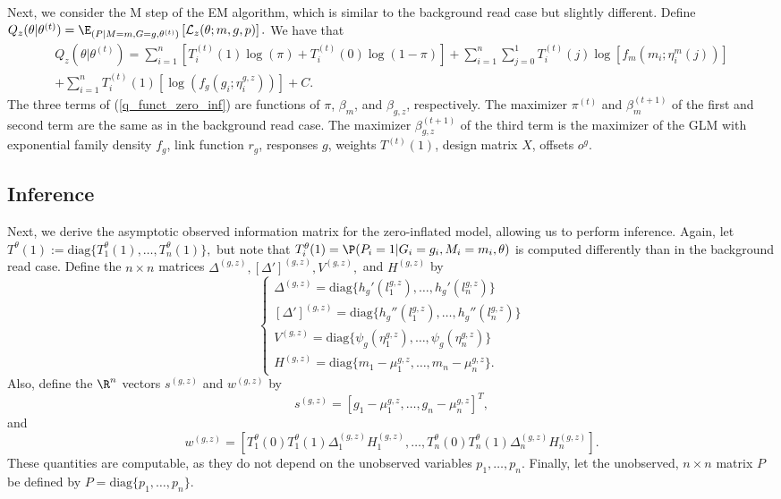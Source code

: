 \documentclass[12pt]{article}
\begin{document}
\begin{appendices}
Next, we consider the M step of the EM algorithm, which is similar to the background read case but slightly different. Define $Q_z(\theta | \theta^{(t)}) = \E_{(P | M = m, G = g, \theta^{(t)})} \left[ \mathcal{L}_z(\theta; m, g, p) \right].$ We have that
\begin{multline}\label{q_funct_zero_inf}
Q_z(\theta | \theta^{(t)}) = \sum_{i=1}^n \left[ T^{(t)}_i(1)\log(\pi) + T_i^{(t)}(0) \log(1 - \pi)\right] + \sum_{i=1}^n \sum_{j=0}^1 T^{(t)}_i(j) \log \left[ f_m( m_i; \eta_i^m(j)) \right] \\ + \sum_{i=1}^n T_i^{(t)}(1) \left[ \log( f_g(g_i; \eta_i^{g, z}))\right] + C.
\end{multline}
The three terms of (\ref{q_funct_zero_inf}) are functions of $\pi$, $\beta_m$, and $\beta_{g,z}$, respectively. The maximizer $\pi^{(t)}$ and $\beta_m^{(t+1)}$ of the first and second term are the same as in the background read case. The maximizer $\beta^{(t+1)}_{g,z}$ of the third term is the maximizer of the GLM with exponential family density $f_g$, link function $r_g$, responses $g$, weights $T^{(t)}(1)$, design matrix $X$, offsets $o^g$.

\subsection{Inference}
Next, we derive the asymptotic observed information matrix for the zero-inflated model, allowing us to perform inference. Again, let $T^{\theta}(1) := \textrm{diag}\{T^{\theta}_1(1), \dots, T^{\theta}_n(1)\},$ but note that $T^\theta_i(1) = \P(P_i = 1 | G_i = g_i, M_i = m_i, \theta)$ is computed differently than in the background read case. Define the $n \times n$ matrices $\Delta^{(g,z)}, [\Delta']^{(g,z)}, V^{(g,z)},$ and $H^{(g,z)}$ by
$$
\begin{cases}
\Delta^{(g,z)} = \textrm{diag} \{ h_g'(l_1^{g,z} ), \dots, h_g'( l_n^{g,z}  ) \} \\
[\Delta']^{(g,z)}  = \textrm{diag} \{ h_g''(l_1^{g,z} ), \dots, h_g''( l_n^{g,z} ) \} \\
V^{(g,z)}  = \textrm{diag} \{ \psi_g( \eta^{g,z} _1), \dots, \psi_g( \eta^{g,z}_n) \} \\
H^{(g,z)}  = \textrm{diag} \{ m_1 - \mu_1^{g,z} , \dots, m_n - \mu_n^{g,z} \} .
\end{cases}
$$
Also, define the $\R^n$ vectors $s^{(g,z)}$ and $w^{(g,z)}$ by
$$s^{(g,z)} = [g_1 - \mu_1^{g,z}, \dots, g_n - \mu_n^{g,z}]^T,$$ and $$w^{(g,z)} = [T^\theta_1(0)T^\theta_1(1) \Delta_1^{(g,z)}H^{(g,z)}_1,\dots, T^\theta_n(0)T^\theta_n(1) \Delta_n^{(g,z)}H^{(g,z)}_n].$$ These quantities are computable, as they do not depend on the unobserved variables $p_1, \dots, p_n$. Finally, let the unobserved, $n\times n$ matrix $P$ be defined by $P = \textrm{diag}\{ p_1, \dots, p_n \}$.



\end{appendices}
\end{document}
